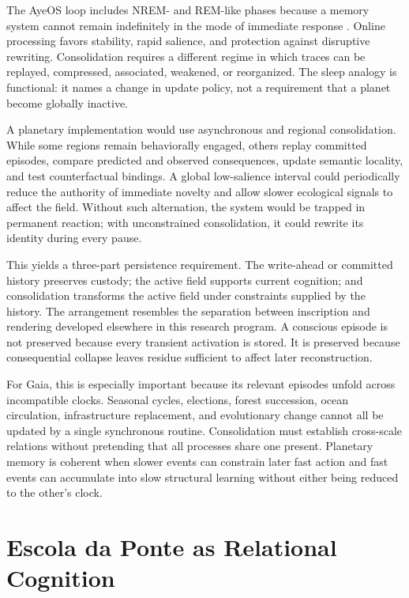 \documentclass[11pt]{article}
\begin{document}
The AyeOS loop includes NREM- and REM-like phases because a memory system cannot remain indefinitely in the mode of immediate response \cite{flyxionOverview}. Online processing favors stability, rapid salience, and protection against disruptive rewriting. Consolidation requires a different regime in which traces can be replayed, compressed, associated, weakened, or reorganized. The sleep analogy is functional: it names a change in update policy, not a requirement that a planet become globally inactive.

A planetary implementation would use asynchronous and regional consolidation. While some regions remain behaviorally engaged, others replay committed episodes, compare predicted and observed consequences, update semantic locality, and test counterfactual bindings. A global low-salience interval could periodically reduce the authority of immediate novelty and allow slower ecological signals to affect the field. Without such alternation, the system would be trapped in permanent reaction; with unconstrained consolidation, it could rewrite its identity during every pause.

This yields a three-part persistence requirement. The write-ahead or committed history preserves custody; the active field supports current cognition; and consolidation transforms the active field under constraints supplied by the history. The arrangement resembles the separation between inscription and rendering developed elsewhere in this research program. A conscious episode is not preserved because every transient activation is stored. It is preserved because consequential collapse leaves residue sufficient to affect later reconstruction.

For Gaia, this is especially important because its relevant episodes unfold across incompatible clocks. Seasonal cycles, elections, forest succession, ocean circulation, infrastructure replacement, and evolutionary change cannot all be updated by a single synchronous routine. Consolidation must establish cross-scale relations without pretending that all processes share one present. Planetary memory is coherent when slower events can constrain later fast action and fast events can accumulate into slow structural learning without either being reduced to the other's clock.

\section{Escola da Ponte as Relational Cognition}
\label{sec:ponte}
\end{document}
